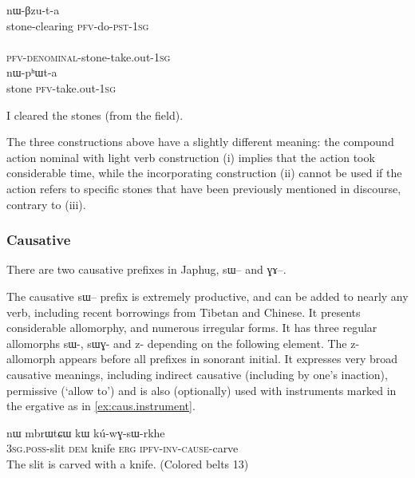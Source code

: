 \documentclass[oldfontcommands,oneside,a4paper,11pt]{article}
\newcommand{\ipa}[1]{{\phon #1}} %
\begin{document}
\begin{exe}   
\ex
\begin{xlist}[(ii)]
\gll     \ipa{cɯ-pʰɯt} \ipa{nɯ-βzu-t-a}  \\
  stone-clearing \textsc{pfv}-do-\textsc{pst}-\textsc{1sg} \\
\gll     \ipa{nɯ-ɣɯ-cɯ-pʰɯt-a}  \\
  \textsc{pfv-denominal}-stone-take.out-\textsc{1sg} \\
\gll     \ipa{cɯ} \ipa{nɯ-pʰɯt-a}  \\
  stone \textsc{pfv}-take.out-\textsc{1sg} \\
  \end{xlist}
 \glt   I cleared the stones (from the field). 
\end{exe}   

The three constructions above have a slightly different meaning: the compound action nominal with light verb construction (i) implies that the action took considerable time, while the incorporating construction (ii) cannot be used if the action refers to specific stones that have been previously mentioned in discourse, contrary  to (iii).

\subsubsection{Causative}
There are two causative prefixes in Japhug, \ipa{sɯ--} and \ipa{ɣɤ--}. 

The causative   \ipa{sɯ--} prefix is extremely productive, and can be added to nearly any verb, including recent borrowings from Tibetan and Chinese. It presents  considerable allomorphy, and numerous irregular forms. It has three regular allomorphs \ipa{sɯ-}, \ipa{sɯɣ-} and \ipa{z-} depending on the following element. The \ipa{z-} allomorph appears before all prefixes in sonorant initial. It expresses very broad causative meanings, including indirect causative (including by one's inaction), permissive (`allow to') and is also (optionally) used with  instruments marked in the ergative as in \ref{ex:caus.instrument}.


\begin{exe}
\ex \label{ex:caus.instrument}
\gll  \ipa{ɯ-χto} 	\ipa{nɯ} 	\ipa{mbrɯtɕɯ} 	\ipa{kɯ} 	\ipa{kú-wɣ-sɯ-rkhe}  \\
\textsc{3sg.poss}-slit \textsc{dem} knife \textsc{erg}  \textsc{ipfv-inv-cause}-carve \\
 \glt  The slit is carved with a knife. (Colored belts 13)
\end{exe} 
\end{document}

